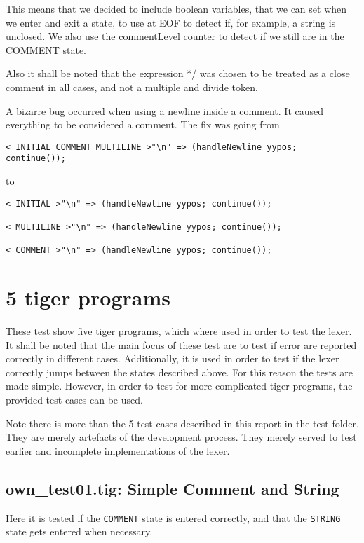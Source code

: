 \documentclass{article}
\begin{document}
This means that we decided to include boolean variables, that we can set when we enter and exit a state, to use at EOF to detect if, for example, a string is unclosed. We also use the commentLevel counter to detect if we still are in the COMMENT state.

Also it shall be noted that the expression */ was chosen to be treated as a close comment in all cases, and not a multiple and divide token.


A bizarre bug occurred when using a newline inside a comment. It caused everything to be considered a comment. The fix was going from
\begin{lstlisting}[frame=single]
< INITIAL COMMENT MULTILINE >"\n" => (handleNewline yypos; continue());
\end{lstlisting}
to
\begin{lstlisting}[frame=single]
< INITIAL >"\n" => (handleNewline yypos; continue());

< MULTILINE >"\n" => (handleNewline yypos; continue());

< COMMENT >"\n" => (handleNewline yypos; continue());
\end{lstlisting}

\section{5 tiger programs}
These test show five tiger programs, which where used in order to test the lexer. It shall be noted that the main focus of these test are to test if error are reported correctly in different cases. Additionally, it is used in order to test if the lexer correctly jumps between the states described above. For this reason the tests are made simple. However, in order to test for more complicated tiger programs, the provided test cases can be used.

Note there is more than the 5 test cases described in this report in the test folder. They are merely artefacts of the development process. They merely served to test earlier and incomplete implementations of the lexer.

\subsection{own\_test01.tig: Simple Comment and String}
Here it is tested if the \texttt{COMMENT} state is entered correctly, and that the \texttt{STRING} state gets entered when necessary.
\end{document}
